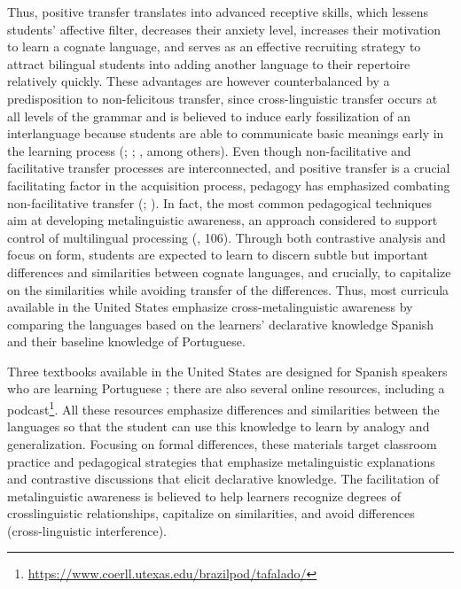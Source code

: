 \documentclass[output=paper]{../langscibook}
\begin{document}
Thus, positive transfer translates into advanced receptive skills, which lessens students’ affective filter, decreases their anxiety level, increases their motivation to learn a cognate language, and serves as an effective recruiting strategy to attract bilingual students into adding another language to their repertoire relatively quickly. These advantages are however counterbalanced by a predisposition to non-felicitous transfer, since cross-linguistic transfer occurs at all levels of the grammar and is believed to induce early fossilization of an interlanguage because students are able to communicate basic meanings early in the learning process (\citealt{SimoesKelm1991}; \citealt{Takeuchi1984}; \citealt{CarvalhoEtAl2010}, among others). Even though non-facilitative and facilitative transfer processes are interconnected, and positive transfer is a crucial facilitating factor in the acquisition process, pedagogy has emphasized combating non-facilitative transfer (\citealt{Carvalho2002}; \citealt{CarvalhoChild2018}). In fact, the most common pedagogical techniques aim at developing metalinguistic awareness, an approach considered to support control of multilingual processing (\citealt{Jessner2006}, 106). Through both contrastive analysis and focus on form, students are expected to learn to discern subtle but important differences and similarities between cognate languages, and crucially, to capitalize on the similarities while avoiding transfer of the differences. Thus, most curricula available in the United States emphasize cross-metalinguistic awareness by comparing the languages based on the learners’ declarative knowledge Spanish and their baseline knowledge of Portuguese. 

Three textbooks available in the United States are designed for Spanish speakers who are learning Portuguese \citep{Simoes1992,Simoes2010,BatemanEtAl2016}; there are also several online resources, including a podcast\footnote{\url{https://www.coerll.utexas.edu/brazilpod/tafalado/}}. All these resources emphasize differences and similarities between the languages so that the student can use this knowledge to learn by analogy and generalization. Focusing on formal differences, these materials target classroom practice and pedagogical strategies that emphasize metalinguistic explanations and contrastive discussions that elicit declarative knowledge. The facilitation of metalinguistic awareness is believed to help learners recognize degrees of crosslinguistic relationships, capitalize on similarities, and avoid differences (cross-linguistic interference). 
\end{document}
